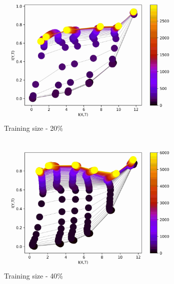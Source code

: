 \documentclass[dissertation.tex]{subfiles}
\begin{document}
\begin{figure}[ht]
  \centering
  \begin{subfigure}[t]{0.32\textwidth}
    \centering
    \includegraphics[width=\textwidth]{figs/eval/trainingSize/KDE20.jpg}
    \caption{
      Training size - 20\%
    }
  \end{subfigure}
  \begin{subfigure}[t]{0.32\textwidth}
    \centering
    \includegraphics[width=\textwidth]{figs/eval/trainingSize/KDE40.jpg}
    \caption{
      Training size - 40\%
    }
  \end{subfigure}
  \begin{subfigure}[t]{0.32\textwidth}
    \centering

\end{subfigure}
\end{figure}
\end{document}
